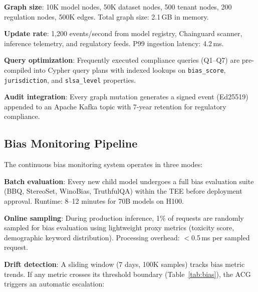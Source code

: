 \documentclass[conference,10pt]{IEEEtran}
\begin{document}
\textbf{Graph size}: 10K model nodes, 50K dataset nodes, 500 tenant nodes, 200 regulation nodes, 500K edges. Total graph size: 2.1\,GB in memory.

\textbf{Update rate}: 1,200 events/second from model registry, Chainguard scanner, inference telemetry, and regulatory feeds. P99 ingestion latency: 4.2\,ms.

\textbf{Query optimization}: Frequently executed compliance queries (Q1--Q7) are pre-compiled into Cypher query plans with indexed lookups on \texttt{bias\_score}, \texttt{jurisdiction}, and \texttt{slsa\_level} properties.

\textbf{Audit integration}: Every graph mutation generates a signed event (Ed25519) appended to an Apache Kafka topic with 7-year retention for regulatory compliance.

\subsection{Bias Monitoring Pipeline}

The continuous bias monitoring system operates in three modes:

\textbf{Batch evaluation}: Every new child model undergoes a full bias evaluation suite (BBQ, StereoSet, WinoBias, TruthfulQA) within the TEE before deployment approval. Runtime: 8--12 minutes for 70B models on H100.

\textbf{Online sampling}: During production inference, 1\% of requests are randomly sampled for bias evaluation using lightweight proxy metrics (toxicity score, demographic keyword distribution). Processing overhead: $<$0.5\,ms per sampled request.

\textbf{Drift detection}: A sliding window (7 days, 100K samples) tracks bias metric trends. If any metric crosses its threshold boundary (Table~\ref{tab:bias}), the ACG triggers an automatic escalation:
\end{document}
